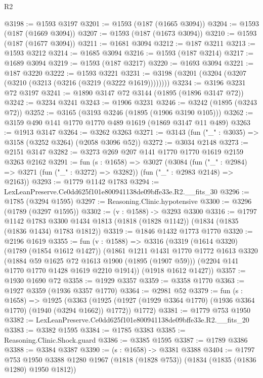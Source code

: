 \begin{lexlean}{R2}
\begin{coremodule}
@3198 := @1593 @3197
@3201 := @1593 (@187 (@1665 @3094))
@3204 := @1593 (@187 (@1669 @3094))
@3207 := @1593 (@187 (@1673 @3094))
@3210 := @1593 (@187 (@1677 @3094))
@3211 := @1681 @3094
@3212 := @187 @3211
@3213 := @1593 @3212
@3214 := @1685 @3094
@3216 := @1593 (@187 @3214)
@3217 := @1689 @3094
@3219 := @1593 (@187 @3217)
@3220 := @1693 @3094
@3221 := @187 @3220
@3222 := @1593 @3221
@3231 := @3198 (@3201 (@3204 (@3207 (@3210 (@3213 (@3216 (@3219 (@3222 @1619))))))))
@3234 := @3196 @3231 @72 @3197
@3241 := @1890 @3147 @72 @3144 (@1895 (@1896 @3147 @72))
@3242 := @3234 @3241
@3243 := @1906 @3231
@3246 := @3242 (@1895 (@3243 @72))
@3252 := @3165 (@3193 @3246 (@1895 (@1906 @3190 @105)))
@3262 := @3159 @490 @141 @1770 @1770 @489 @1619 (@1869 @3147 @11 @489)
@3263 := @1913 @3147
@3264 := @3262 @3263
@3271 := @3143 (fun ("_" : @3035) => @3158 (@3252 @3264) (@2058 @3096 @52))
@3272 := @3034 @2148
@3273 := @2151 @3147
@3282 := @3273 @269 @207 @141 @1770 @1770 @1619 @2159 @3263 @2162
@3291 := fun (s : @1658) =>
  @3027
    (@3084
      (fun ("_" : @2984) => @3271 (fun ("_" : @3272) => @3282))
      (fun ("_" : @2983 @2148) => @2163))
@3293 := @1779 @1142 @1783
@3294 := LexLeanPreserve.Ce0dd625f101e800941138de09bffe33e.R2.__fits_30
@3296 := @1785 (@3294 @1595)
@3297 := Reasoning.Clinic.hypotensive
@3300 := @3296 (@1789 (@3297 @1595))
@3302 := (v : @1588) -> @3293 @3300
@3316 := @1797
    @1142
    @1783
    @3300
    @1434
    @1813
    (@1818 (@1828 @1142))
    (@1834 (@1835 (@1836 @1434) @1783 @1812))
@3319 := @1846 @1432 @1773 @1770
@3320 := @2196 @1619
@3355 := fun (v : @1588) =>
  @3316
    (@3319
      (@1614 @3320)
      (@1789 (@1854 @1612 @1427))
      (@1861
        @1211
        @1431
        @1770
        @1772
        @1613
        @3320
        (@1884 @59 @1625 @72 @1613 @1900 (@1895 (@1907 @59)))
        (@2204 @141 @1770 @1770 @1428 @1619 @2210 @1914))
      (@1918 @1612 @1427))
@3357 := @1930 @1690 @72
@3358 := @1929 @3357
@3359 := @3358 @1770
@3363 := @1927 @3359 (@1936 @3357 @1770)
@3364 := @2981 @52
@3379 := fun (s : @1658) =>
  @1925
    (@3363
      (@1925 (@1927 (@1929 @3364 @1770) (@1936 @3364 @1770) (@1940 (@3294 @1662)) @1772))
      @1772)
@3381 := @1779 @753 @1950
@3382 := LexLeanPreserve.Ce0dd625f101e800941138de09bffe33e.R2.__fits_20
@3383 := @3382 @1595
@3384 := @1785 @3383
@3385 := Reasoning.Clinic.Shock.guard
@3386 := @3385 @1595
@3387 := @1789 @3386
@3388 := @3384 @3387
@3390 := (s : @1658) -> @3381 @3388
@3404 := @1797
    @753
    @1950
    @3388
    @1280
    @1967
    (@1818 (@1828 @753))
    (@1834 (@1835 (@1836 @1280) @1950 @1812))

\end{coremodule}
\end{lexlean}
